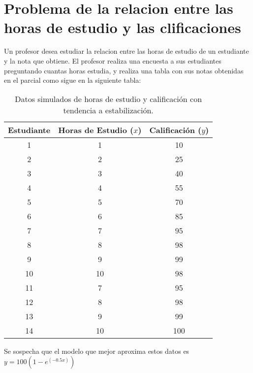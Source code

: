 \documentclass{article}
\begin{document}
\section{Problema de la relacion entre las horas de estudio y las clificaciones}

Un profesor desea estudiar la relacion entre las horas de estudio de un estudiante y la nota que obtiene. El profesor
realiza una encuesta a sus estudiantes preguntando cuantas horas estudia, y realiza una tabla con sus notas obtenidas 
en el parcial como sigue en la siguiente tabla:

\begin{table}[h!]
    \centering
    \begin{tabular}{ccc}
    \toprule
    \textbf{Estudiante} & \textbf{Horas de Estudio (\(x\))} & \textbf{Calificación (\(y\))} \\
    \midrule
    1  & 1  & 10   \\
    2  & 2  & 25   \\
    3  & 3  & 40   \\
    4  & 4  & 55   \\
    5  & 5  & 70   \\
    6  & 6  & 85   \\
    7  & 7  & 95   \\
    8  & 8  & 98   \\
    9  & 9  & 99   \\
    10 & 10 & 98  \\
    11  & 7  & 95   \\
    12  & 8  & 98   \\
    13  & 9  & 99   \\
    14 & 10 & 100  \\
    \bottomrule
    \end{tabular}
    \caption{Datos simulados de horas de estudio y calificación con tendencia a estabilización.}
    \label{tabla:horas_estudio_aplanada}
    \end{table}

Se sospecha que el modelo que mejor aproxima estos datos es $y = 100(1-e^(-0.5x))$
\end{document}
